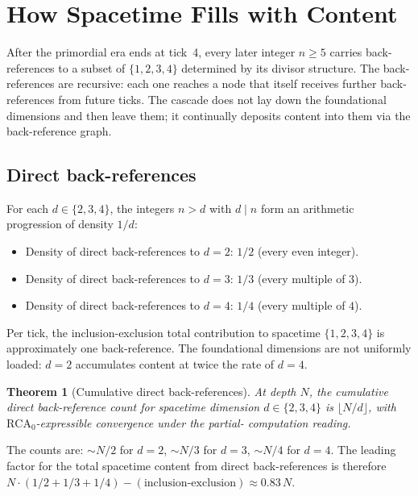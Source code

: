 \documentclass[11pt,a4paper]{article}
\newtheorem{theorem}{Theorem}[section]
\begin{document}
\section{How Spacetime Fills with Content}\label{sec:spacetime-fills}

After the primordial era ends at tick~4, every later integer
$n \geq 5$ carries back-references to a subset of $\{1, 2, 3, 4\}$
determined by its divisor structure. The back-references are
recursive: each one reaches a node that itself receives further
back-references from future ticks. The cascade does not lay down the
foundational dimensions and then leave them; it continually deposits
content into them via the back-reference graph.

\subsection*{Direct back-references}

For each $d \in \{2, 3, 4\}$, the integers $n > d$ with $d \mid n$
form an arithmetic progression of density $1/d$:
\begin{itemize}
\item Density of direct back-references to $d = 2$: $1/2$
(every even integer).
\item Density of direct back-references to $d = 3$: $1/3$
(every multiple of $3$).
\item Density of direct back-references to $d = 4$: $1/4$
(every multiple of $4$).
\end{itemize}

\noindent Per tick, the inclusion-exclusion total contribution to
spacetime $\{1, 2, 3, 4\}$ is approximately one back-reference. The
foundational dimensions are not uniformly loaded: $d = 2$ accumulates
content at twice the rate of $d = 4$.

\begin{theorem}[Cumulative direct back-references]\label{thm:direct-backref}
At depth $N$, the cumulative direct back-reference count for
spacetime dimension $d \in \{2, 3, 4\}$ is $\lfloor N/d \rfloor$,
with $\mathrm{RCA}_0$-expressible convergence under the partial-
computation reading.
\end{theorem}

\noindent The counts are: $\sim N/2$ for $d = 2$, $\sim N/3$ for
$d = 3$, $\sim N/4$ for $d = 4$. The leading factor for the total
spacetime content from direct back-references is therefore
$N \cdot (1/2 + 1/3 + 1/4) - (\text{inclusion-exclusion}) \approx
0.83\, N$.
\end{document}
